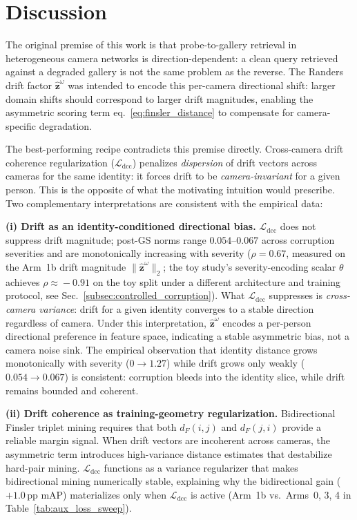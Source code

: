 \section{Discussion} \label{sec:discussion}
The original premise of this work is that probe-to-gallery retrieval in heterogeneous camera networks is direction-dependent: a clean query retrieved against a degraded gallery is not the same problem as the reverse. The Randers drift factor $\hat{\mathbf{z}}^{\omega}$ was intended to encode this per-camera directional shift: larger domain shifts should correspond to larger drift magnitudes, enabling the asymmetric scoring term eq.~\eqref{eq:finsler_distance} to compensate for camera-specific degradation.

The best-performing recipe contradicts this premise directly. Cross-camera drift coherence regularization ($\mathcal{L}_{\mathrm{dcc}}$) penalizes \emph{dispersion} of drift vectors across cameras for the same identity: it forces drift to be \emph{camera-invariant} for a given person. This is the opposite of what the motivating intuition would prescribe. Two complementary interpretations are consistent with the empirical data:

\textbf{(i) Drift as an identity-conditioned directional bias.} $\mathcal{L}_{\mathrm{dcc}}$ does not suppress drift magnitude; post-GS norms range $0.054$--$0.067$ across corruption severities and are monotonically increasing with severity ($\rho{=}0.67$, measured on the Arm~1b drift magnitude $\|\hat{\mathbf{z}}^{\omega}\|_2$; the toy study's severity-encoding scalar $\theta$ achieves $\rho\!\approx\!-0.91$ on the toy split under a different architecture and training protocol, see Sec.~\ref{subsec:controlled_corruption}). What $\mathcal{L}_{\mathrm{dcc}}$ suppresses is \emph{cross-camera variance}: drift for a given identity converges to a stable direction regardless of camera. Under this interpretation, $\hat{\mathbf{z}}^{\omega}$ encodes a per-person directional preference in feature space, indicating a stable asymmetric bias, not a camera noise sink. The empirical observation that identity distance grows monotonically with severity ($0 {\to} 1.27$) while drift grows only weakly ($0.054{\to}0.067$) is consistent: corruption bleeds into the identity slice, while drift remains bounded and coherent.

\textbf{(ii) Drift coherence as training-geometry regularization.} Bidirectional Finsler triplet mining requires that both $d_F(i,j)$ and $d_F(j,i)$ provide a reliable margin signal. When drift vectors are incoherent across cameras, the asymmetric term introduces high-variance distance estimates that destabilize hard-pair mining. $\mathcal{L}_{\mathrm{dcc}}$ functions as a variance regularizer that makes bidirectional mining numerically stable, explaining why the bidirectional gain ($+1.0\,\mathrm{pp}$ mAP) materializes only when $\mathcal{L}_{\mathrm{dcc}}$ is active (Arm~1b vs.\ Arms~0, 3, 4 in Table~\ref{tab:aux_loss_sweep}).


